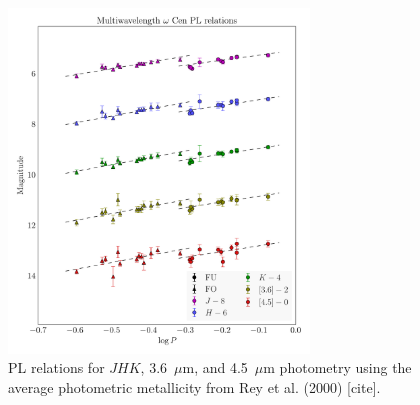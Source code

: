 \documentclass[a4paper,fleqn,usenatbib]{mnras}
\begin{document}
\begin{figure}
\begin{center}
\includegraphics[width=80mm]{final_plots/multiwavelength_PL_samestars_phot.pdf}
\caption{PL relations for $J\!H\!K$, 3.6~$\mu$m, and 4.5~$\mu$m photometry using the average photometric metallicity from Rey et al. (2000) [cite].}
\label{fig:omegaCen_pl_phot}
\end{center}
\end{figure}
\end{document}
